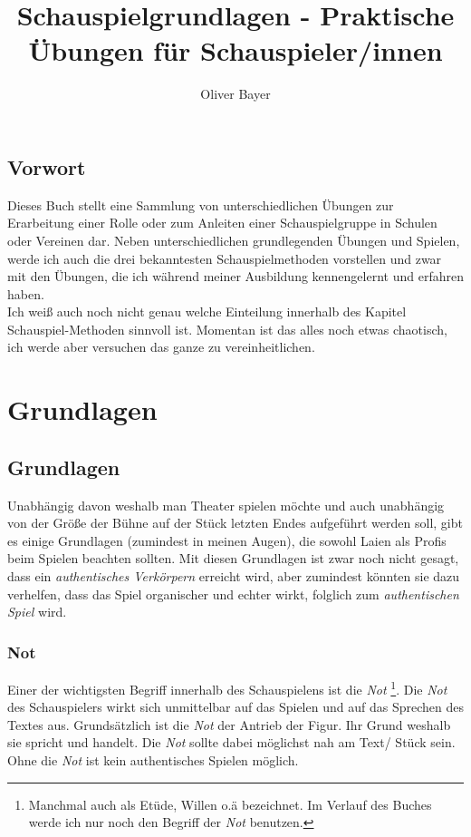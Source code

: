 \documentclass[ngerman, a4paper, twoside]{scrbook}%
\author{Oliver Bayer}
\title{Schauspielgrundlagen - Praktische Übungen für Schauspieler/innen}
\begin{document}
\frontmatter
\maketitle
\tableofcontents
	\chapter{Vorwort}
	Dieses Buch stellt eine Sammlung von unterschiedlichen Übungen zur Erarbeitung einer Rolle oder zum Anleiten einer Schauspielgruppe in Schulen oder Vereinen dar. Neben unterschiedlichen grundlegenden Übungen und Spielen, werde ich auch die drei bekanntesten Schauspielmethoden vorstellen und zwar mit den Übungen, die ich während meiner Ausbildung kennengelernt und erfahren haben.\\
	Ich weiß auch noch nicht genau welche Einteilung innerhalb des Kapitel Schauspiel-Methoden sinnvoll ist. Momentan ist das alles noch etwas chaotisch, ich werde aber versuchen das ganze zu vereinheitlichen.

	\mainmatter
	\part{Grundlagen}
	\chapter{Grundlagen}
	Unabhängig davon weshalb man Theater spielen möchte und auch unabhängig von der Größe der Bühne auf der Stück letzten Endes aufgeführt werden soll, gibt es einige Grundlagen (zumindest in meinen Augen), die sowohl Laien als Profis beim Spielen beachten sollten. Mit diesen Grundlagen ist zwar noch nicht gesagt, dass ein \emph{authentisches Verkörpern}
	 erreicht wird, aber zumindest könnten sie dazu verhelfen, dass das Spiel organischer und echter wirkt, folglich zum \emph{authentischen Spiel} %
	 wird.
	\section{Not}
	Einer der wichtigsten Begriff innerhalb des Schauspielens ist die \emph{Not} \footnote{Manchmal auch als Etüde, Willen o.ä bezeichnet. Im Verlauf des Buches werde ich nur noch den Begriff der \emph{Not} benutzen.}. Die \emph{Not} des Schauspielers wirkt sich unmittelbar auf das Spielen und auf das Sprechen des Textes aus. Grundsätzlich ist die \emph{Not} der Antrieb der Figur. Ihr Grund weshalb sie spricht und handelt. Die \emph{Not} sollte dabei möglichst nah am Text/ Stück  sein. Ohne die \emph{Not} ist kein authentisches Spielen möglich.
\end{document}
